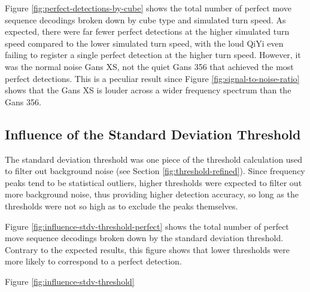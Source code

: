 Figure \ref{fig:perfect-detections-by-cube} shows the total number of
perfect move sequence decodings broken down by cube type and simulated
turn speed. As expected, there were far fewer perfect detections at the
higher simulated turn speed compared to the lower simulated turn speed,
with the loud QiYi even failing to register a single perfect detection
at the higher turn speed. However, it was the normal noise Gans XS, not
the quiet Gans 356 that achieved the most perfect detections. This is a
peculiar result since Figure \ref{fig:signal-to-noise-ratio} shows that
the Gans XS is louder across a wider frequency spectrum than the Gans
356.

\subsection{Influence of the Standard Deviation Threshold}
\label{subsec:influence-stdv-threshold}

The standard deviation threshold was one piece of the threshold
calculation used to filter out background noise (see Section
\ref{fig:threshold-refined}). Since frequency peaks tend to be
statistical outliers, higher thresholds were expected to filter out
more background noise, thus providing higher detection accuracy, so
long as the thresholds were not so high as to exclude the peaks
themselves.

Figure \ref{fig:influence-stdv-threshold-perfect} shows the total number of
perfect move sequence decodings broken down by the standard deviation
threshold. Contrary to the expected results, this figure shows that lower thresholds were more likely to correspond to a perfect detection.

Figure \ref{fig:influence-stdv-threshold} %
 
